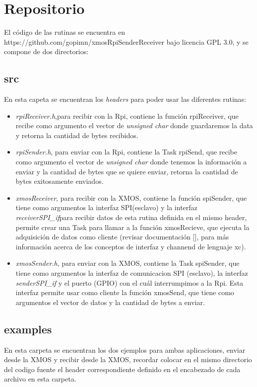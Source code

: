 \documentclass{article}
\begin{document}
\section{Repositorio}
El código de las rutinas se encuentra en https://github.com/gopimn/xmosRpiSenderReceiver bajo licencia GPL 3.0, y se compone de dos directorios:
\subsection{src}
En esta capeta se encuentran los {\it headers} para poder usar las diferentes rutinas:
\begin{itemize}
\item {\it rpiReceiver.h},para recibir con la Rpi, contiene la función rpiReceiver, que recibe como argumento el vector de {\it unsigned char} donde guardaremos la data y retorna la cantidad de bytes recibidos.
\item {\it rpiSender.h}, para enviar con la Rpi, contiene la Task rpiSend, que recibe como argumento el vector de {\it unsigned char} donde tenemos la información a enviar y la cantidad de bytes que se quiere enviar, retorna la cantidad de bytes exitosamente enviados.
\item {\it xmosReceiver}, para recibir con la XMOS, contiene la función spiSender, que tiene como argumentos la interfaz SPI(esclavo) y la interfaz {\it receiverSPI\_if}para recibir datos de esta rutina definida en el mismo header, permite crear una Task para llamar a la función xmosRecieve, que ejecuta la adquisición de datos como cliente (revisar documentación [], para más información acerca de los conceptos de interfaz y channend de lenguaje xc).
\item {\it xmosSender.h}, para enviar con la XMOS, contiene la Task spiSender, que tiene como argumentos la interfaz de comunicacion SPI (esclavo), la interfaz {\it senderSPI\_if} y el puerto (GPIO) con el cuál interrumpimos a la Rpi. Esta interfaz permite usar como cliente la función xmosSend, que tiene como argumentos el vector de datos y la cantidad de bytes a enviar.
\end{itemize}
  \subsection{examples}
  En esta carpeta se encuentran los dos ejemplos para ambas aplicaciones, enviar desde la XMOS y recibir desde la XMOS, recordar colocar en el mismo directorio del codigo fuente el header correspondiente definido en el encabezado de cada archivo en esta carpeta.\newpage
\end{document}
